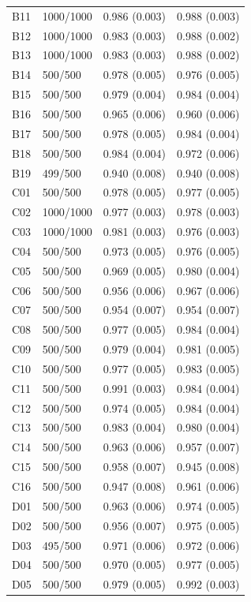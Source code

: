 \begin{longtable}[t]{llll}
B11 & 1000/1000 & 0.986 (0.003) & 0.988 (0.003)\\
B12 & 1000/1000 & 0.983 (0.003) & 0.988 (0.002)\\
B13 & 1000/1000 & 0.983 (0.003) & 0.988 (0.002)\\
B14 & 500/500 & 0.978 (0.005) & 0.976 (0.005)\\
B15 & 500/500 & 0.979 (0.004) & 0.984 (0.004)\\
B16 & 500/500 & 0.965 (0.006) & 0.960 (0.006)\\
B17 & 500/500 & 0.978 (0.005) & 0.984 (0.004)\\
B18 & 500/500 & 0.984 (0.004) & 0.972 (0.006)\\
B19 & 499/500 & 0.940 (0.008) & 0.940 (0.008)\\
C01 & 500/500 & 0.978 (0.005) & 0.977 (0.005)\\
C02 & 1000/1000 & 0.977 (0.003) & 0.978 (0.003)\\
C03 & 1000/1000 & 0.981 (0.003) & 0.976 (0.003)\\
C04 & 500/500 & 0.973 (0.005) & 0.976 (0.005)\\
C05 & 500/500 & 0.969 (0.005) & 0.980 (0.004)\\
C06 & 500/500 & 0.956 (0.006) & 0.967 (0.006)\\
C07 & 500/500 & 0.954 (0.007) & 0.954 (0.007)\\
C08 & 500/500 & 0.977 (0.005) & 0.984 (0.004)\\
C09 & 500/500 & 0.979 (0.004) & 0.981 (0.005)\\
C10 & 500/500 & 0.977 (0.005) & 0.983 (0.005)\\
C11 & 500/500 & 0.991 (0.003) & 0.984 (0.004)\\
C12 & 500/500 & 0.974 (0.005) & 0.984 (0.004)\\
C13 & 500/500 & 0.983 (0.004) & 0.980 (0.004)\\
C14 & 500/500 & 0.963 (0.006) & 0.957 (0.007)\\
C15 & 500/500 & 0.958 (0.007) & 0.945 (0.008)\\
C16 & 500/500 & 0.947 (0.008) & 0.961 (0.006)\\
D01 & 500/500 & 0.963 (0.006) & 0.974 (0.005)\\
D02 & 500/500 & 0.956 (0.007) & 0.975 (0.005)\\
D03 & 495/500 & 0.971 (0.006) & 0.972 (0.006)\\
D04 & 500/500 & 0.970 (0.005) & 0.977 (0.005)\\
D05 & 500/500 & 0.979 (0.005) & 0.992 (0.003)\\

\end{longtable}
